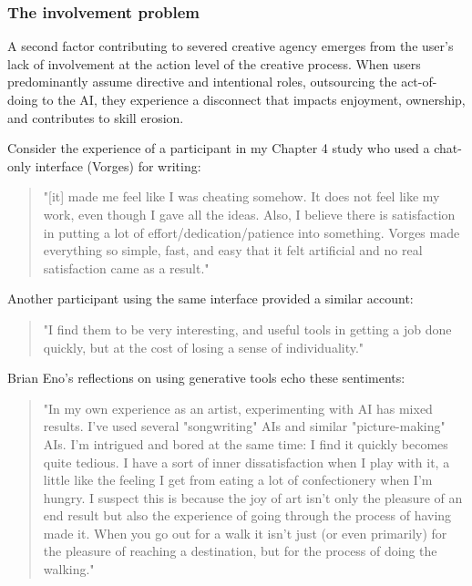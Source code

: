 \subsubsection{The involvement problem}

A second factor contributing to severed creative agency emerges from the user's lack of involvement at the action level of the creative process. When users predominantly assume directive and intentional roles, outsourcing the act-of-doing to the AI, they experience a disconnect that impacts enjoyment, ownership, and contributes to skill erosion. 

Consider the experience of a participant in my Chapter 4 study who used a chat-only interface (Vorges) for writing:

\begin{quote}
"[it] made me feel like I was cheating somehow. It does not feel like my work, even though I gave all the ideas. Also, I believe there is satisfaction in putting a lot of effort/dedication/patience into something. Vorges made everything so simple, fast, and easy that it felt artificial and no real satisfaction came as a result."
\end{quote}

Another participant using the same interface provided a similar account:

\begin{quote}
"I find them to be very interesting, and useful tools in getting a job done quickly, but at the cost of losing a sense of individuality."
\end{quote}

Brian Eno's reflections on using generative tools echo these sentiments:

\begin{quote}
"In my own experience as an artist, experimenting with AI has mixed results. I've used several "songwriting" AIs and similar "picture-making" AIs. I'm intrigued and bored at the same time: I find it quickly becomes quite tedious. I have a sort of inner dissatisfaction when I play with it, a little like the feeling I get from eating a lot of confectionery when I'm hungry. I suspect this is because the joy of art isn't only the pleasure of an end result but also the experience of going through the process of having made it. When you go out for a walk it isn't just (or even primarily) for the pleasure of reaching a destination, but for the process of doing the walking." \cite{Eno2024-rj}
\end{quote}


